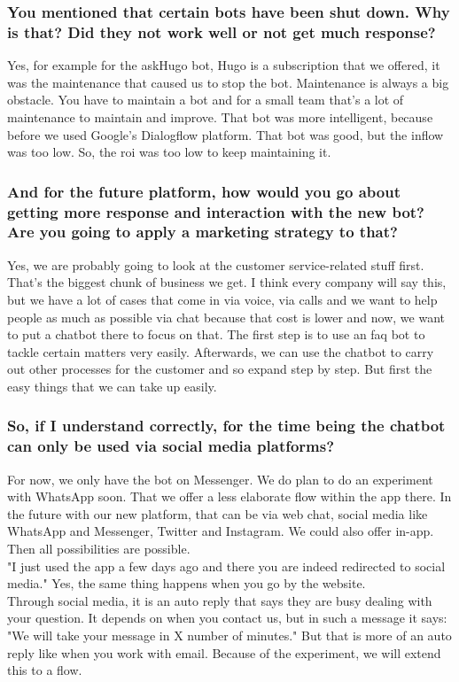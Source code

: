 \begin{appendices}
	\subsubsection{You mentioned that certain bots have been shut down. Why is that? Did they not work well or not get much response?}
	Yes, for example for the askHugo bot, Hugo is a subscription that we offered, it was the maintenance that caused us to stop the bot. Maintenance is always a big obstacle. You have to maintain a bot and for a small team that's a lot of maintenance to maintain and improve. That bot was more intelligent, because before we used Google's Dialogflow platform. That bot was good, but the inflow was too low. So, the \acrshort{roi} was too low to keep maintaining it.
	
	\subsubsection{And for the future platform, how would you go about getting more response and interaction with the new bot? Are you going to apply a marketing strategy to that?}
	Yes, we are probably going to look at the customer service-related stuff first. That's the biggest chunk of business we get. I think every company will say this, but we have a lot of cases that come in via voice, via calls and we want to help people as much as possible via chat because that cost is lower and now, we want to put a chatbot there to focus on that. The first step is to use an \acrshort{faq} bot to tackle certain matters very easily. Afterwards, we can use the chatbot to carry out other processes for the customer and so expand step by step. But first the easy things that we can take up easily.
	
	\subsubsection{So, if I understand correctly, for the time being the chatbot can only be used via social media platforms?}
	For now, we only have the bot on Messenger. We do plan to do an experiment with WhatsApp soon. That we offer a less elaborate flow within the app there. In the future with our new platform, that can be via web chat, social media like WhatsApp and Messenger, Twitter and Instagram. We could also offer in-app. Then all possibilities are possible. \\
	\break
	"I just used the app a few days ago and there you are indeed redirected to social media." Yes, the same thing happens when you go by the website.\\
	\break
	Through social media, it is an auto reply that says they are busy dealing with your question. It depends on when you contact us, but in such a message it says: "We will take your message in X number of minutes." But that is more of an auto reply like when you work with email. Because of the experiment, we will extend this to a flow.
	

\end{appendices}
